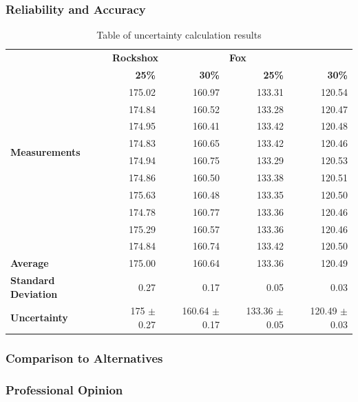 	\subsubsection{Reliability and Accuracy}
		\begin{table}[h!]
			\centering
			\caption{Table of uncertainty calculation results}
			\label{tab:uncertainty}
		\begin{tabular}{|l|r|r|r|r|}
			\hline
			\multirow{12}{7em}{\bfseries Measurements}&\multicolumn{2}{|l|}{\bfseries Rockshox}&\multicolumn{2}{|l|}{\bfseries Fox}\\
			\cline{2-5}
			&\bfseries 25\%&\bfseries 30\%&\bfseries 25\%&\bfseries 30\%\\
			\hline
			&175.02&160.97&133.31&120.54\\
			&174.84&160.52&133.28&120.47\\
			&174.95&160.41&133.42&120.48\\
			&174.83&160.65&133.42&120.46\\
			&174.94&160.75&133.29&120.53\\
			&174.86&160.50&133.38&120.51\\
			&175.63&160.48&133.35&120.50\\
			&174.78&160.77&133.36&120.46\\
			&175.29&160.57&133.36&120.46\\
			&174.84&160.74&133.42&120.50\\
			\hline
			\bfseries Average&175.00&160.64&133.36&120.49\\
			\bfseries Standard Deviation&0.27&0.17&0.05&0.03\\
			\bfseries Uncertainty&175 $\pm$ 0.27&160.64 $\pm$ 0.17&133.36 $\pm$ 0.05&120.49 $\pm$ 0.03\\
			\hline
		\end{tabular}
		\end{table}
	\subsubsection{Comparison to Alternatives}
	\subsubsection{Professional Opinion}